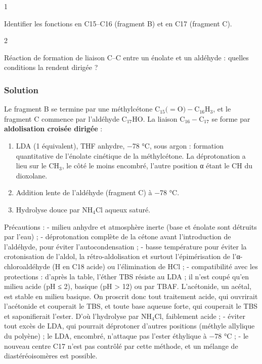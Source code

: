 \documentclass[11pt,a4paper]{article}
\providecommand{\tightlist}{\setlength{\itemsep}{0pt}\setlength{\parskip}{0pt}}
\begin{document}
\begin{indication}{1}

Identifier les fonctions en C15--C16 (fragment B) et en C17 (fragment C).

\end{indication}

\begin{indication}{2}

Réaction de formation de liaison C--C entre un énolate et un aldéhyde : quelles conditions la rendent dirigée ?

\end{indication}

\hypertarget{solution-34}{%
\subsubsection{Solution}\label{solution-34}}

Le fragment B se termine par une méthylcétone \(\mathrm{C_{15}(} = \mathrm{O){-}C_{16}H_3}\), et le fragment C commence par l'aldéhyde \(\mathrm{C_{17}HO}\). La liaison \(\mathrm{C_{16}{-}C_{17}}\) se forme par \textbf{aldolisation croisée dirigée} :

\begin{enumerate}
\def\labelenumi{\arabic{enumi}.}
\tightlist
\item
  LDA (1 équivalent), THF anhydre, −78 °C, sous argon : formation quantitative de l'énolate cinétique de la méthylcétone. La déprotonation a lieu sur le CH\(_3\), le côté le moins encombré, l'autre position α étant le CH du dioxolane.
\item
  Addition lente de l'aldéhyde (fragment C) à −78 °C.
\item
  Hydrolyse douce par NH\(_4\)Cl aqueux saturé.
\end{enumerate}

Précautions :
- milieu anhydre et atmosphère inerte (base et énolate sont détruits par l'eau) ;
- déprotonation complète de la cétone avant l'introduction de l'aldéhyde, pour éviter l'autocondensation ;
- basse température pour éviter la crotonisation de l'aldol, la rétro-aldolisation et surtout l'épimérisation de l'α-chloroaldéhyde (H en C18 acide) ou l'élimination de HCl ;
- compatibilité avec les protections : d'après la table, l'éther TBS résiste au LDA ; il n'est coupé qu'en milieu acide (pH ≤ 2), basique (pH \textgreater{} 12) ou par TBAF. L'acétonide, un acétal, est stable en milieu basique. On proscrit donc tout traitement acide, qui ouvrirait l'acétonide et couperait le TBS, et toute base aqueuse forte, qui couperait le TBS et saponifierait l'ester. D'où l'hydrolyse par NH\(_4\)Cl, faiblement acide ;
- éviter tout excès de LDA, qui pourrait déprotoner d'autres positions (méthyle allylique du polyène) ; le LDA, encombré, n'attaque pas l'ester éthylique à −78 °C ;
- le nouveau centre C17 n'est pas contrôlé par cette méthode, et un mélange de diastéréoisomères est possible.
\end{document}
